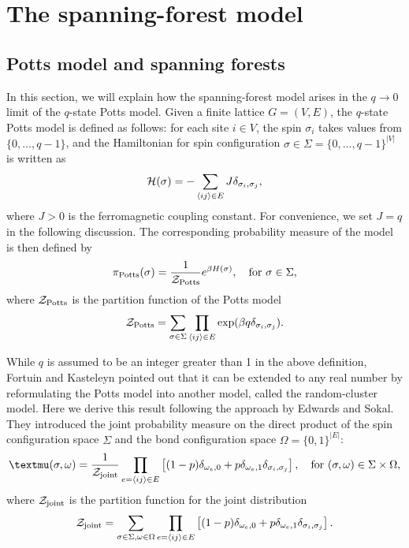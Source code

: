 \chapter{The spanning-forest model}\label{chap:SPF}

\section{Potts model and spanning forests}
In this section, we will explain how the spanning-forest model arises in the $q\to 0$ limit of the $q$-state Potts model.
Given a finite lattice $G = (V, E)$, the $q$-state Potts model is defined as follows: for each site $i\in V$, the spin 
$\sigma_i$ takes values from $\{0, \dots, q-1\}$, and the Hamiltonian for spin configuration $\sigma \in \Sigma = \{0,\dots, q-1\}^{|V|}$
is written as
\begin{equation}\label{eq:Potts_H}
	{\mathcal H}(\sigma) = -\sum_{\langle ij \rangle \in E}J \delta_{\sigma_i, \sigma_j},
\end{equation}
where $J>0$ is the ferromagnetic coupling constant. For convenience, we set $J = q$ in the following discussion.
The corresponding probability measure of the model is then defined by 
\begin{equation}
	\pi_{\text{Potts}}(\sigma) = \frac{1}{\scrZ_{\text{Potts}}} e^{\beta H(\sigma)}, \quad  \text{for} \ \sigma \in \Sigma,
\end{equation}
where ${\mathcal Z}_{\text{Potts}}$ is the partition function of the Potts model
\begin{equation}
	{\mathcal Z}_{\text{Potts}} = \sum_{\sigma\in \Sigma} \prod_{\langle ij \rangle \in E} \exp(\beta q\delta_{\sigma_i, \sigma_j}).
\end{equation}

While $q$ is assumed to be an integer greater than 1 in the above definition, 
Fortuin and Kasteleyn \cite{Fortuin1972} pointed out that it can be extended to any real number by reformulating the Potts model into another model, 
called the random-cluster model. Here we derive this result following the approach by Edwards and Sokal\cite{Edwards1988}.
They introduced the joint probability measure on the direct product of the spin configuration space $\Sigma$ and the bond configuration
space $\Omega = \{0, 1\}^{|E|}$:
\begin{equation}\label{eq:joint_measure}
	\mu(\sigma, \omega)	= \frac{1}{\scrZ_{\text{joint}}} \prod_{e=\langle ij \rangle \in E} \left[(1-p)\delta_{\omega_e, 0} + p\delta_{\omega_e, 1}\delta_{\sigma_i, \sigma_j}\right],
	\quad \text{for}\ (\sigma, \omega) \in \Sigma\times\Omega,
\end{equation}
where ${\mathcal Z}_{\text{joint}}$ is the partition function for the joint distribution
\begin{equation}
	{\mathcal Z}_{\text{joint}} = \sum_{\sigma\in \Sigma, \omega \in \Omega} \prod_{e=\langle ij \rangle \in E} \left[(1-p)\delta_{\omega_e, 0} + p\delta_{\omega_e, 1}\delta_{\sigma_i, \sigma_j}\right].
\end{equation}

